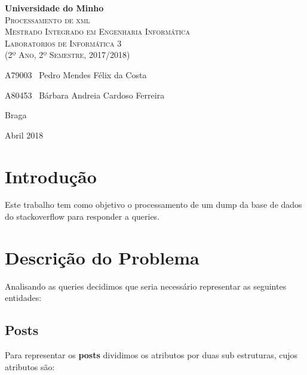 \documentclass[10pt,a4paper]{article}
\begin{document}
\begin{titlepage}
    \center
    {\huge {\bf Universidade do Minho}}\\[0.4cm]
    \vspace{3.0cm}
    \textsc{\huge{Processamento de xml}}\\[0.5cm] %
    \vspace{3.0cm}
    \textsc{\huge{Mestrado Integrado em Engenharia Informática}}\\[0.5cm]
    \vspace{2.0cm}
    \textsc{Laboratorios de Informática 3}\\[0.5cm]
    \textsc{(2º Ano, 2º Semestre, 2017/2018)}\\[0.5cm]
    \vspace{1.5cm}
    \begin{flushleft}
        A79003 \,\,\,Pedro Mendes Félix da Costa
        \vspace{0.2cm}

        A80453 \,\,\,Bárbara Andreia Cardoso Ferreira
    \end{flushleft}
        \vspace{1cm}
    \begin{flushright}
        Braga

        Abril 2018
    \end{flushright}

\end{titlepage}

\tableofcontents
\clearpage

\section{Introdução}
    Este trabalho tem como objetivo o processamento de um dump da base de dados
    do stackoverflow para responder a queries.

\section{Descrição do Problema}
    Analisando as queries decidimos que seria necessário representar
    as seguintes entidades:

    \subsection{Posts}
    Para representar os \textbf{posts} dividimos os atributos por duas
     sub estruturas, cujos atributos são:
\end{document}
